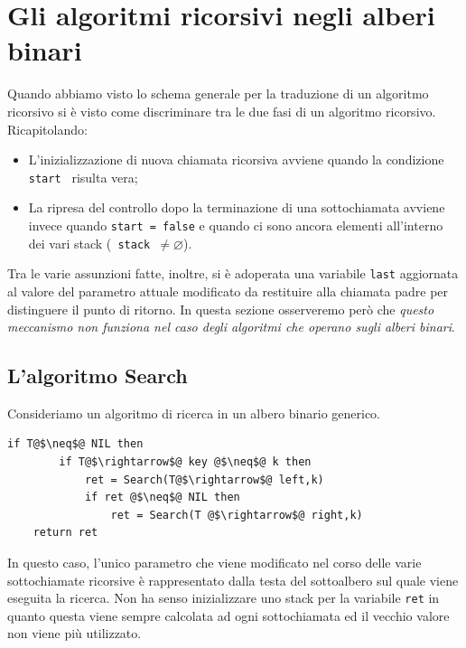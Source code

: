 \section{Gli algoritmi ricorsivi negli alberi binari}
Quando abbiamo visto lo schema generale per la traduzione di un algoritmo ricorsivo si è visto come discriminare tra le due fasi di un algoritmo ricorsivo. Ricapitolando:
\begin{itemize}
	\item L'inizializzazione di nuova chiamata ricorsiva avviene quando la condizione \texttt{start } risulta vera;
	\item La ripresa del controllo dopo  la terminazione di una sottochiamata  avviene invece quando \texttt{start = false} e quando ci sono ancora elementi all'interno dei vari stack (\texttt{ stack $\neq \varnothing$}).
\end{itemize}
Tra le varie assunzioni fatte, inoltre, si è adoperata una variabile \texttt{last} aggiornata al valore del parametro attuale modificato da restituire alla chiamata padre per distinguere il punto di ritorno. In questa sezione osserveremo però che \textit{questo meccanismo non funziona nel caso degli algoritmi che operano sugli alberi binari}.

\subsection{L'algoritmo Search}
Consideriamo un algoritmo di ricerca in un albero binario generico.
\begin{lstlisting}[language=asd,caption={\textsc{Search}(T,k)}]
	if T@$\neq$@ NIL then
		if T@$\rightarrow$@ key @$\neq$@ k then
			ret = Search(T@$\rightarrow$@ left,k)
			if ret @$\neq$@ NIL then
				ret = Search(T @$\rightarrow$@ right,k)
	return ret
\end{lstlisting}

In questo caso, l'unico parametro che viene modificato nel corso delle varie sottochiamate ricorsive è rappresentato dalla testa del sottoalbero sul quale viene eseguita la ricerca. Non ha senso inizializzare uno stack per la variabile \texttt{ret} in quanto questa viene sempre calcolata ad ogni sottochiamata ed il vecchio valore non viene più utilizzato.

